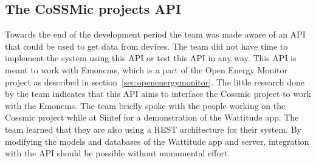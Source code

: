 \subsection{The CoSSMic projects API}
\label{sec:cossmicapi}
Towards the end of the development period the team was made aware of an API that could be used to get data from devices. The team did not have time to implement the system using this API or test this API in any way. This API is meant to work with Emoncms, which is a part of the Open Energy Monitor project as described in section~\ref{sec:openenergymonitor}. The little research done by the team indicates that this API aims to interface the Cossmic project to work with the Emoncms. The team briefly spoke with the people working on the Cossmic project while at Sintef for a demonstration of the Wattitude app. The team learned that they are also using a REST architecture for their system. By modifying the models and databases of the Wattitude app and server, integration with the API should be possible without monumental effort.
